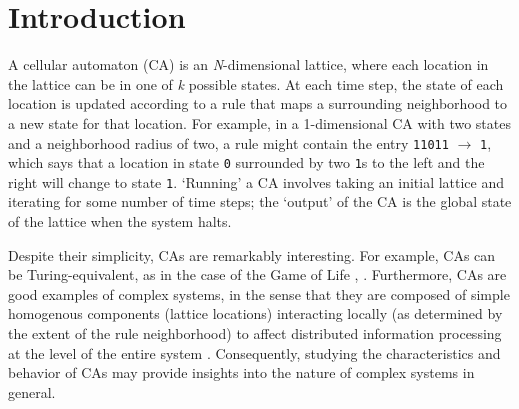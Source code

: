 \section{Introduction}

A cellular automaton (CA) is an \textit{N}-dimensional lattice, where each location in the lattice can be in one of \textit{k} possible states. 
At each time step, the state of each location is updated according to a rule that maps a surrounding neighborhood to 
a new state for that location. For example, in a 1-dimensional CA with two states and a neighborhood radius of two, a rule might contain the entry \texttt{11011} 
$\rightarrow$ \texttt{1}, which says that a location in state \texttt{0} surrounded by two \texttt{1}s to the left and the right will change to state \texttt{1}. 
`Running' a CA involves taking an initial lattice and iterating for some number of time steps; the `output' of the CA is the global state of the 
lattice when the system halts.

Despite their simplicity, CAs are remarkably interesting. For example, CAs can be Turing-equivalent, as in the case of the Game of Life 
\cite{berlekamp_winning_1982}, \cite{adamatzky_turing_2001}. Furthermore, CAs are good examples of complex systems, in the sense that 
they are composed of simple homogenous components (lattice locations) interacting locally (as determined by the extent of the rule neighborhood) to affect  distributed information processing at the level of the entire system \cite{mitchell_complexity:_2009}. Consequently, studying the characteristics and 
behavior of CAs may provide insights into the nature of complex systems in general. 

